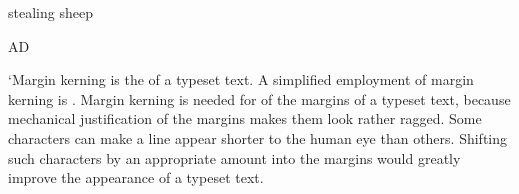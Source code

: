 \documentclass{article}
\begin{document}
{\lsstyle stealing sheep}

AD


 `Margin kerning is the  of a
  typeset text. A simplified employment of margin kerning is . Margin kerning is needed for  of the margins
  of a typeset text, because mechanical justification of the margins makes
  them look rather ragged. Some characters can make a line appear shorter to
  the human eye than others. Shifting such characters by an appropriate
  amount into the margins would greatly improve the appearance of a typeset
  text.
\end{document}
